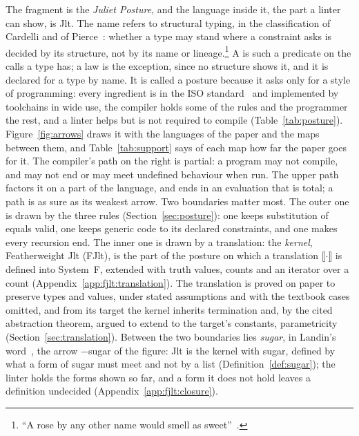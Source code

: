 The fragment is the \emph{Juliet Posture}, and the language inside it, the part a linter can show, is Jlt.
The name refers to structural typing, in the classification of Cardelli and of Pierce~\cite{cardelli1996typesystems,pierce2002tapl}: whether a type may stand where a constraint asks is decided by its structure, not by its name or lineage.\footnote{``A rose by any other name would smell as sweet''~\cite{shakespeare1597romeo}.}
A  is such a predicate on the calls a type has; a law is the exception, since no structure shows it, and it is declared for a type by name.
It is called a posture because it asks only for a style of programming: every ingredient is in the ISO standard~\cite{cpp23standard} and implemented by toolchains in wide use, the compiler holds some of the rules and the programmer the rest, and a linter helps but is not required to compile (Table~\ref{tab:posture}).
Figure~\ref{fig:arrows} draws it with the languages of the paper and the maps between them, and Table~\ref{tab:support} says of each map how far the paper goes for it.
The compiler's path on the right is partial: a program may not compile, and may not end or may meet undefined behaviour when run.
The upper path factors it on a part of the language, and ends in an evaluation that is total; a path is as sure as its weakest arrow.
Two boundaries matter most.
The outer one is drawn by the three rules (Section~\ref{sec:posture}): one keeps substitution of equals valid, one keeps generic code to its declared constraints, and one makes every recursion end.
The inner one is drawn by a translation: the \emph{kernel}, Featherweight Jlt (FJlt), is the part of the posture on which a translation $\llbracket\cdot\rrbracket$ is defined into System~F, extended with truth values, counts and an iterator over a count (Appendix~\ref{app:fjlt:translation}).
The translation is proved on paper to preserve types and values, under stated assumptions and with the textbook cases omitted, and from its target the kernel inherits termination and, by the cited abstraction theorem, argued to extend to the target's constants, parametricity (Section~\ref{sec:translation}).
Between the two boundaries lies \emph{sugar}, in Landin's word~\cite{landin1964mechanical}, the arrow $-$sugar of the figure: Jlt is the kernel with sugar, defined by what a form of sugar must meet and not by a list (Definition~\ref{def:sugar}); the linter holds the forms shown so far, and a form it does not hold leaves a definition undecided (Appendix~\ref{app:fjlt:closure}).

